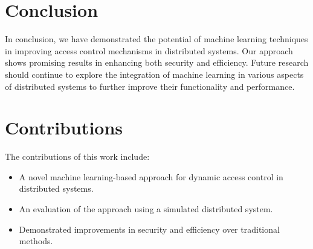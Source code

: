 \documentclass[12pt]{article}
\begin{document}
\section{Conclusion}
In conclusion, we have demonstrated the potential of machine learning techniques in improving access control mechanisms in distributed systems. Our approach shows promising results in enhancing both security and efficiency. Future research should continue to explore the integration of machine learning in various aspects of distributed systems to further improve their functionality and performance.

\section{Contributions}
The contributions of this work include:
\begin{itemize}
    \item A novel machine learning-based approach for dynamic access control in distributed systems.
    \item An evaluation of the approach using a simulated distributed system.
    \item Demonstrated improvements in security and efficiency over traditional methods.
\end{itemize}



\end{document}
